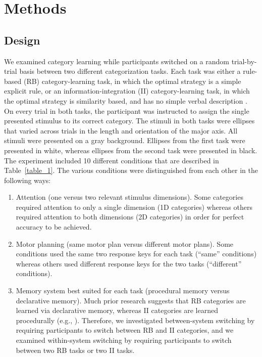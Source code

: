 \documentclass[doc, floatsintext]{apa7}
\begin{document}
\section{Methods}
\subsection{Design}
We examined category learning while participants switched on
a random trial-by-trial basis between two different
categorization tasks. Each task was either a rule-based (RB)
category-learning task, in which the optimal strategy is a
simple explicit rule, or an information-integration (II)
category-learning task, in which the optimal strategy is
similarity based, and has no simple verbal description
\parencite{ashby_neuropsychological_1998,
ashby_decision_1988}. On every trial in both tasks, the
participant was instructed to assign the single presented
stimulus to its correct category. The stimuli in both tasks
were ellipses that varied across trials in the length and
orientation of the major axis. All stimuli were presented on
a gray background. Ellipses from the first task were
presented in white, whereas ellipses from the second task
were presented in black. The experiment included 10
different conditions that are described in
Table~\ref{table_1}. The various conditions were
distinguished from each other in the following ways:

\begin{enumerate}
\item Attention (one versus two relevant stimulus
    dimensions). Some categories required attention to only
        a single dimension (1D categories) whereas others
        required attention to both dimensions (2D
        categories) in order for perfect accuracy to be
        achieved.

\item Motor planning (same motor plan versus different motor
    plans). Some conditions used the same two response keys
        for each task (``same'' conditions) whereas others
        used different response keys for the two tasks
        (``different'' conditions).

\item Memory system best suited for each task  (procedural
    memory versus declarative memory). Much prior research
        suggests that RB categories are learned via
        declarative memory, whereas II categories are
        learned procedurally (e.g., \cite{ashby_human_2010,
        ashby_multiple_2017, smith_implicit_2012-1}).
        Therefore, we investigated between-system switching
        by requiring participants to switch between RB and
        II categories, and we examined within-system
        switching by requiring participants to switch
        between two RB tasks or two II tasks.
\end{enumerate}
\end{document}
